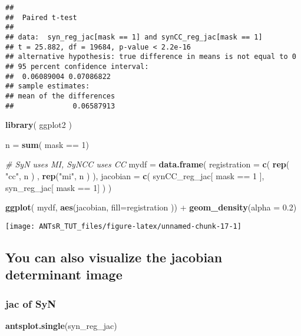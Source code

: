 \documentclass[]{tufte-handout}
\newenvironment{Shaded}{}{}
\newcommand{\CommentTok}[1]{\textcolor[rgb]{0.38,0.63,0.69}{\textit{#1}}}
\newcommand{\DataTypeTok}[1]{\textcolor[rgb]{0.56,0.13,0.00}{#1}}
\newcommand{\DecValTok}[1]{\textcolor[rgb]{0.25,0.63,0.44}{#1}}
\newcommand{\FloatTok}[1]{\textcolor[rgb]{0.25,0.63,0.44}{#1}}
\newcommand{\KeywordTok}[1]{\textcolor[rgb]{0.00,0.44,0.13}{\textbf{#1}}}
\newcommand{\NormalTok}[1]{#1}
\newcommand{\OperatorTok}[1]{\textcolor[rgb]{0.40,0.40,0.40}{#1}}
\newcommand{\StringTok}[1]{\textcolor[rgb]{0.25,0.44,0.63}{#1}}
\begin{document}
\begin{verbatim}
## 
##  Paired t-test
## 
## data:  syn_reg_jac[mask == 1] and synCC_reg_jac[mask == 1]
## t = 25.882, df = 19684, p-value < 2.2e-16
## alternative hypothesis: true difference in means is not equal to 0
## 95 percent confidence interval:
##  0.06089004 0.07086822
## sample estimates:
## mean of the differences 
##              0.06587913
\end{verbatim}

\begin{Shaded}
\begin{Highlighting}[]
\KeywordTok{library}\NormalTok{( ggplot2 )}

\NormalTok{n =}\StringTok{ }\KeywordTok{sum}\NormalTok{( mask }\OperatorTok{==}\StringTok{ }\DecValTok{1}\NormalTok{)}

\CommentTok{# SyN uses MI, SyNCC uses CC}
\NormalTok{mydf =}\StringTok{ }\KeywordTok{data.frame}\NormalTok{( }
  \DataTypeTok{registration =} \KeywordTok{c}\NormalTok{( }\KeywordTok{rep}\NormalTok{( }\StringTok{"cc"}\NormalTok{, n ) , }\KeywordTok{rep}\NormalTok{(}\StringTok{"mi"}\NormalTok{, n ) ),}
  \DataTypeTok{jacobian =} \KeywordTok{c}\NormalTok{( synCC_reg_jac[ mask }\OperatorTok{==}\StringTok{ }\DecValTok{1}\NormalTok{ ], syn_reg_jac[ mask }\OperatorTok{==}\StringTok{ }\DecValTok{1}\NormalTok{] ) )}

\KeywordTok{ggplot}\NormalTok{( mydf, }\KeywordTok{aes}\NormalTok{(jacobian, }\DataTypeTok{fill=}\NormalTok{registration )) }\OperatorTok{+}\StringTok{ }\KeywordTok{geom_density}\NormalTok{(}\DataTypeTok{alpha =} \FloatTok{0.2}\NormalTok{)}
\end{Highlighting}
\end{Shaded}

\texttt{[image: ANTsR\_TUT\_files/figure-latex/unnamed-chunk-17-1]}

\hypertarget{you-can-also-visualize-the-jacobian-determinant-image}{%
\subsection{You can also visualize the jacobian determinant
image}\label{you-can-also-visualize-the-jacobian-determinant-image}}

\hypertarget{jac-of-syn}{%
\subsubsection{jac of SyN}\label{jac-of-syn}}

\begin{Shaded}
\begin{Highlighting}[]
\KeywordTok{antsplot.single}\NormalTok{(syn_reg_jac)}
\end{Highlighting}
\end{Shaded}
\end{document}
